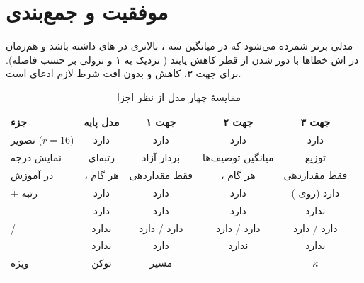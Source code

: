 \section*{ موفقیت و جمع‌بندی}

\begin{keybox}
مدلی برتر شمرده می‌شود که در میانگین سه ،  بالاتری در های  داشته باشد و هم‌زمان در ‌اش خطاها با دور شدن از قطر کاهش یابند ( نزدیک به ۱ و  نزولی بر حسب فاصله). برای جهت ۳، کاهش  و  بدون افت  شرط لازم ادعای  است.
\end{keybox}

\begin{table}[H]
\caption{مقایسهٔ چهار مدل از نظر اجزا}
\label{tab:summary}
\centering\small
\begin{tabularx}{\textwidth}{@{}p{3.6cm} C C C C@{}}
\toprule
\textbf{جزء} & \textbf{مدل پایه} & \textbf{جهت ۱} & \textbf{جهت ۲} & \textbf{جهت ۳}\\
\midrule
{} تصویر ($r=16$) & دارد & دارد & دارد & دارد\\
نمایش درجه &  رتبه‌ای & بردار آزاد & میانگین توصیف‌ها & توزیع \\
 در آموزش & ، هر گام & فقط مقداردهی & ، هر گام & فقط مقداردهی\\
 +  رتبه & دارد & دارد & دارد & دارد (روی  )\\
 & دارد & دارد & دارد & ندارد\\
 /  & ندارد & دارد / دارد & دارد / دارد & دارد / دارد\\
 & ندارد & دارد & ندارد & ندارد\\
 ویژه &  توکن & مسیر &  &  $\kappa$\\
  &  &  &  & \\
\bottomrule
\end{tabularx}
\end{table}

